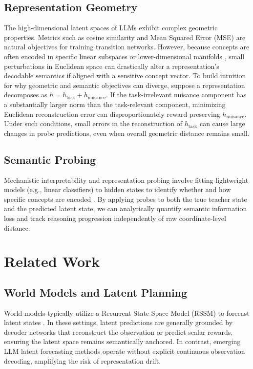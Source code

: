 \documentclass[conference]{IEEEtran}
\begin{document}
\subsection{Representation Geometry}
The high-dimensional latent spaces of LLMs exhibit complex geometric properties. Metrics such as cosine similarity and Mean Squared Error (MSE) are natural objectives for training transition networks. However, because concepts are often encoded in specific linear subspaces or lower-dimensional manifolds \cite{alain2017understanding}, small perturbations in Euclidean space can drastically alter a representation's decodable semantics if aligned with a sensitive concept vector. To build intuition for why geometric and semantic objectives can diverge, suppose a representation decomposes as $h = h_{\text{task}} + h_{\text{nuisance}}$. If the task-irrelevant nuisance component has a substantially larger norm than the task-relevant component, minimizing Euclidean reconstruction error can disproportionately reward preserving $h_{\text{nuisance}}$. Under such conditions, small errors in the reconstruction of $h_{\text{task}}$ can cause large changes in probe predictions, even when overall geometric distance remains small. 

\subsection{Semantic Probing}
Mechanistic interpretability and representation probing involve fitting lightweight models (e.g., linear classifiers) to hidden states to identify whether and how specific concepts are encoded \cite{alain2017understanding}. By applying probes to both the true teacher state and the predicted latent state, we can analytically quantify semantic information loss and track reasoning progression independently of raw coordinate-level distance.

\section{Related Work}

\subsection{World Models and Latent Planning}
World models typically utilize a Recurrent State Space Model (RSSM) to forecast latent states \cite{hafner2020dream}. In these settings, latent predictions are generally grounded by decoder networks that reconstruct the observation or predict scalar rewards, ensuring the latent space remains semantically anchored. In contrast, emerging LLM latent forecasting methods operate without explicit continuous observation decoding, amplifying the risk of representation drift.
\end{document}
